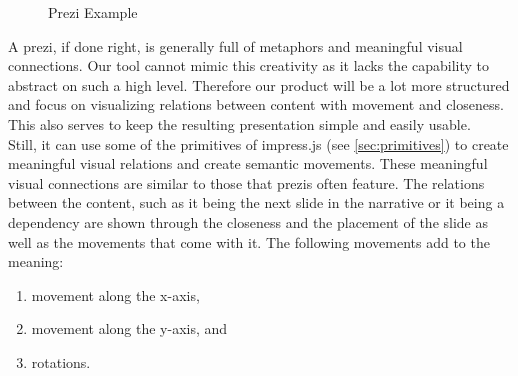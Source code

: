 \documentclass[twoside, 12pt]{article}
\begin{document}
\begin{figure}
\vspace{-26pt}
  \begin{center}
\vspace{-20pt}
  \caption{Prezi Example \cite{npentrel2:npentrel15}}
  \label{fig:preziExample}
\vspace{-24pt}
  \end{center}
\end{figure}

A prezi, if done right, is generally full of metaphors and meaningful visual connections. Our tool cannot mimic this creativity as it lacks the capability to abstract on such a high level. Therefore our product will be a lot more structured and focus on visualizing relations between content with movement and closeness. This also serves to keep the resulting presentation simple and easily usable.\\

Still, it can use some of the primitives of impress.js (see \autoref{sec:primitives}) to create meaningful visual relations and create semantic movements. These meaningful visual connections are similar to those that prezis often feature. The relations between the content, such as it being the next slide in the narrative or it being a dependency are shown through the closeness and the placement of the slide as well as the movements that come with it. The following movements add to the meaning:\\
\vspace{-12pt}
\begin{enumerate}[topsep=0pt,itemsep=-1ex,partopsep=1ex,parsep=1ex]
\item movement along the x-axis,
\item movement along the y-axis, and
\item rotations.
\end{enumerate}
\vspace{5pt}
\end{document}
